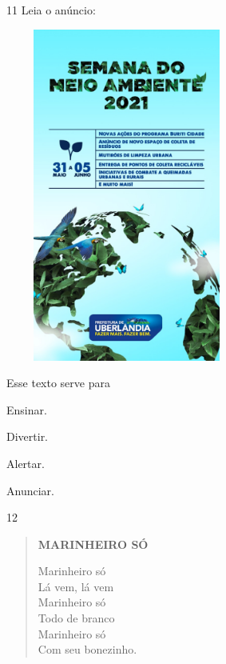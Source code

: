 \num{11} Leia o anúncio:

\includegraphics[width=3.12674in,height=4.31210in]{media/image145.jpeg}


Esse texto serve para

\begin{escolha}
\item Ensinar.

\item Divertir.

\item Alertar.

\item Anunciar.
\end{escolha}

\num{12}

\begin{verse}
\textbf{MARINHEIRO SÓ}

Marinheiro só\\
Lá vem, lá vem\\
Marinheiro só\\
Todo de branco\\
Marinheiro só\\
Com seu bonezinho.

\end{verse}


